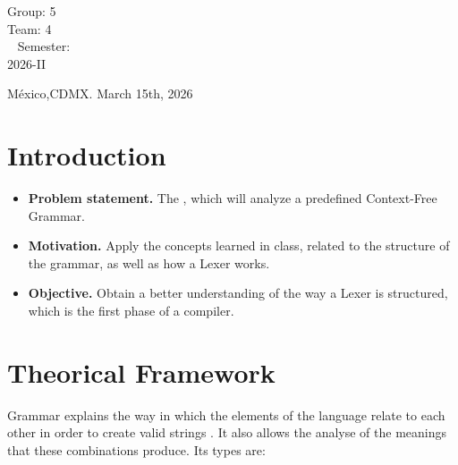\documentclass[letterpaper,12pt,oneside]{article}
\begin{document}
\begin{titlepage}
\begin{center}
\begin{center}
				\bigskip
				
				Group: 5\\
				Team: 4\\\
				Semester: \\
                2026-II
			\end{center}
			
			\vfill
			
			\begin{center}
				{México,CDMX. March 15th, 2026}\\
			\end{center}
			\cleardoublepage
		\end{center}
	\end{titlepage}
 
\tableofcontents
\clearpage
    

\section{Introduction} %

\begin{itemize}
    \item \textbf{Problem statement.} The , which will analyze a predefined Context-Free Grammar. 
    \item \textbf{Motivation.} Apply the concepts learned in class, related to the structure of the grammar, as well as how a Lexer works.
    \item \textbf{Objective.} Obtain a better understanding of the way a Lexer is structured, which is the first phase of a compiler.
\end{itemize}

\section{Theorical Framework}

Grammar explains the way in which the elements of the language relate to each other in order to create valid strings  \cite{unam_gramatica}. It also allows the analyse of the meanings that these combinations produce. Its types are:
\end{document}
